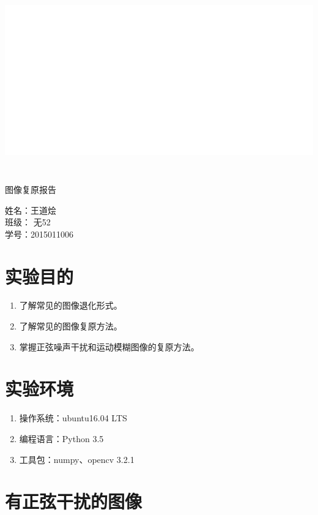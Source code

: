 \documentclass{article}
\begin{document}
	\begin{center}
		\includegraphics[height = 8cm]{blank.png}
		
		{\heiti {} 图像复原报告}
		
		\vspace{10cm}
		
		{\kaishu {}  姓名：王道烩 \\ 班级： 无52 \\ 学号：2015011006\\}
	\end{center}
	
	\newpage
	\section{实验目的}
		\begin{enumerate}
			\item 了解常见的图像退化形式。
			\item 了解常见的图像复原方法。
			\item 掌握正弦噪声干扰和运动模糊图像的复原方法。
		\end{enumerate}
	\section{实验环境}
		\begin{enumerate}
			\item 操作系统：ubuntu16.04 LTS
			\item 编程语言：Python 3.5
			\item 工具包：numpy、opencv 3.2.1
		\end{enumerate}
	\section{有正弦干扰的图像}
\end{document}
